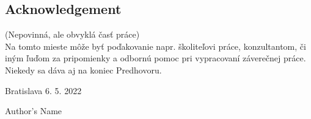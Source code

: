 \null
\vfill

\subsection*{Acknowledgement}

(Nepovinná, ale obvyklá časť práce)\\

Na tomto mieste môže byť poďakovanie napr. školiteľovi práce, konzultantom, či iným ľuďom za pripomienky a odbornú pomoc pri vypracovaní záverečnej práce. Niekedy sa dáva aj na koniec Predhovoru.

\vspace{10pt}

\noindent Bratislava 6. 5. 2022 \hfil
\newline
\begin{flushright}
	Author's Name $\qquad$
\end{flushright}
\cleardoublepage


	


